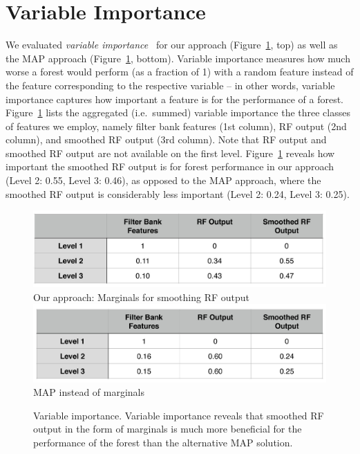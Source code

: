 \documentclass[10pt,twocolumn,letterpaper]{article}
\begin{document}
\section{Variable Importance}
We evaluated \emph{variable importance}~\cite{BreimanRF} for our approach (Figure~\ref{fig:var-importance}, top) as well as the MAP approach (Figure~\ref{fig:var-importance}, bottom). 
Variable importance measures how much worse a forest would perform (as a fraction of 1) with a random feature instead of the feature corresponding to the respective variable -- in other words, variable importance captures how important a feature is for the performance of a forest. 
%
Figure~\ref{fig:var-importance} lists the aggregated (i.e.\ summed) variable importance the three classes of features we employ, namely filter bank features (1st column), RF output (2nd column), and smoothed RF output (3rd column). Note that RF output and smoothed RF output are not available on the first level. 
%
Figure~\ref{fig:var-importance} reveals how important the smoothed RF output is for forest performance in our approach (Level 2: 0.55, Level 3: 0.46), as opposed to the MAP approach, where the smoothed RF output is considerably less important (Level 2: 0.24, Level 3: 0.25). 
%
%
\begin{figure}
\begin{center}
\includegraphics[width=\columnwidth]{VariableImportance_Ours.jpg} %
Our approach: Marginals for smoothing RF output %
\includegraphics[width=\columnwidth]{VariableImportance_MAP.jpg} %
MAP instead of marginals 
\caption{Variable importance. Variable importance reveals that smoothed RF output in the form of marginals is much more beneficial for the performance of the forest than the alternative MAP solution. }
\label{fig:var-importance}
\end{center}
\end{figure}
\end{document}

